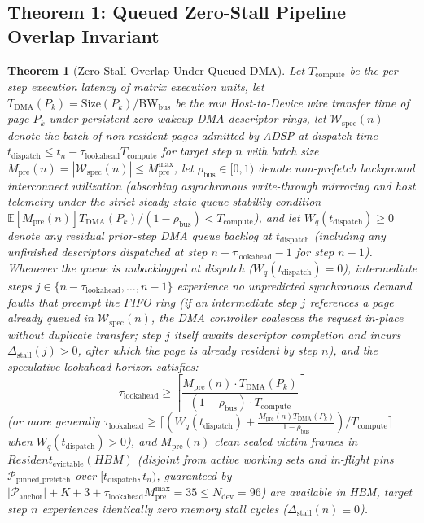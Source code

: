 \documentclass[conference,10pt]{IEEEtran}
\newtheorem{theorem}{Theorem}
\begin{document}
\subsection{Theorem 1: Queued Zero-Stall Pipeline Overlap Invariant}
\begin{theorem}[Zero-Stall Overlap Under Queued DMA]
Let $T_{\text{compute}}$ be the per-step execution latency of matrix execution units, let $T_{\text{DMA}}(P_k) = \text{Size}(P_k)/\text{BW}_{\text{bus}}$ be the raw Host-to-Device wire transfer time of page $P_k$ under persistent zero-wakeup DMA descriptor rings, let $\mathcal{W}_{\text{spec}}(n)$ denote the batch of non-resident pages admitted by ADSP at dispatch time $t_{\text{dispatch}} \le t_n - \tau_{\text{lookahead}} T_{\text{compute}}$ for target step $n$ with batch size $M_{\text{pre}}(n) = |\mathcal{W}_{\text{spec}}(n)| \le M_{\text{pre}}^{\max}$, let $\rho_{\text{bus}} \in [0, 1)$ denote non-prefetch background interconnect utilization (absorbing asynchronous write-through mirroring and host telemetry under the strict steady-state queue stability condition $\mathbb{E}[M_{\text{pre}}(n)]T_{\text{DMA}}(P_k)/(1-\rho_{\text{bus}}) < T_{\text{compute}}$), and let $W_q(t_{\text{dispatch}}) \ge 0$ denote any residual prior-step DMA queue backlog at $t_{\text{dispatch}}$ (including any unfinished descriptors dispatched at step $n - \tau_{\text{lookahead}} - 1$ for step $n-1$). Whenever the queue is unbacklogged at dispatch ($W_q(t_{\text{dispatch}}) = 0$), intermediate steps $j \in \{n - \tau_{\text{lookahead}}, \dots, n-1\}$ experience no unpredicted synchronous demand faults that preempt the FIFO ring (if an intermediate step $j$ references a page already queued in $\mathcal{W}_{\text{spec}}(n)$, the DMA controller coalesces the request in-place without duplicate transfer; step $j$ itself awaits descriptor completion and incurs $\Delta_{\text{stall}}(j) > 0$, after which the page is already resident by step $n$), and the speculative lookahead horizon satisfies:
\begin{equation}
\label{eq:lookahead_cond}
\tau_{\text{lookahead}} \ge \left\lceil \frac{M_{\text{pre}}(n) \cdot T_{\text{DMA}}(P_k)}{(1 - \rho_{\text{bus}}) \cdot T_{\text{compute}}} \right\rceil
\end{equation}
(or more generally $\tau_{\text{lookahead}} \ge \lceil (W_q(t_{\text{dispatch}}) + \frac{M_{\text{pre}}(n) T_{\text{DMA}}(P_k)}{1 - \rho_{\text{bus}}}) / T_{\text{compute}} \rceil$ when $W_q(t_{\text{dispatch}}) > 0$), and $M_{\text{pre}}(n)$ clean sealed victim frames in $\textit{Resident}_{\text{evictable}}(\textit{HBM})$ (disjoint from active working sets and in-flight pins $\mathcal{P}_{\text{pinned\_prefetch}}$ over $[t_{\text{dispatch}}, t_n)$, guaranteed by $|\mathcal{P}_{\text{anchor}}| + K + 3 + \tau_{\text{lookahead}}M_{\text{pre}}^{\max} = 35 \le N_{\text{dev}} = 96$) are available in HBM, target step $n$ experiences identically zero memory stall cycles ($\Delta_{\text{stall}}(n) \equiv 0$).
\end{theorem}
\end{document}
